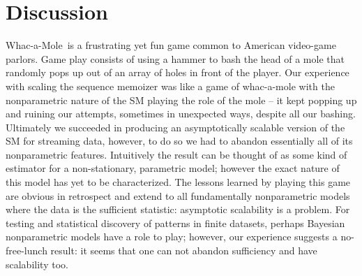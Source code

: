 \section{Discussion}
\label{sec:discussion}

Whac-a-Mole\texttrademark~is a frustrating yet fun game common to American video-game parlors.  Game play consists of using a hammer to bash the head of a mole that randomly pops up out of an array of holes in front of the player.  Our experience with scaling the sequence memoizer was like a game of whac-a-mole with the nonparametric nature of the SM playing the role of the mole -- it kept popping up and ruining our attempts, sometimes in unexpected ways, despite all our bashing.  Ultimately we succeeded in producing an asymptotically scalable version of the SM for streaming data, however, to do so we had to abandon essentially all of its nonparametric features.  Intuitively the result can be thought of as some kind of estimator for a non-stationary, parametric model; however the exact nature of this model has yet to be characterized.  The lessons learned by playing this game are obvious in retrospect and extend to all fundamentally nonparametric models where the data is the sufficient statistic: asymptotic scalability is a problem.   For testing and statistical discovery of patterns in finite datasets, perhaps Bayesian nonparametric models have a role to play; however, our experience suggests a no-free-lunch result: it seems that one can not abandon sufficiency and have scalability too.


